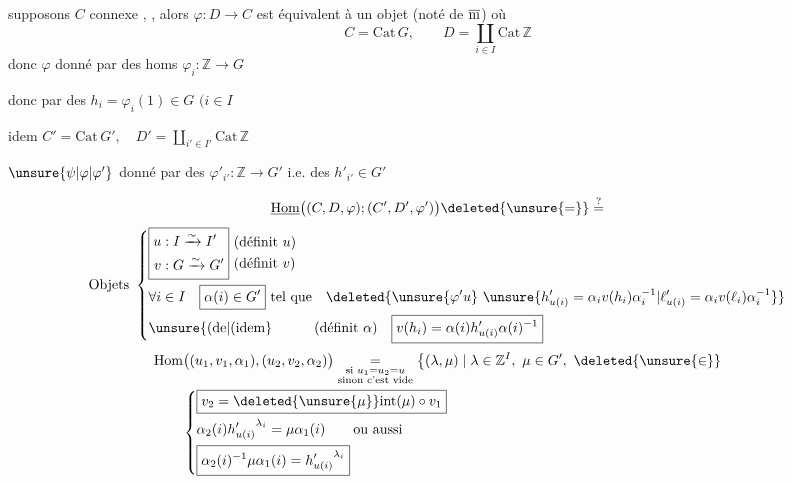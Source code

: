 supposons $C$ connexe , , alors $\varphi:D\to C$ est équivalent à un objet (noté de $\overline{\rm m}$) où
\[
 C=\mathrm{Cat}\,G,\qquad D=\coprod_{i\in I}\mathrm{Cat}\,\mathbb Z
\]
donc $\varphi$ donné par des homs $\varphi_i:\mathbb Z\to G$

donc par des $h_i=\varphi_i(1)\in G$ \qquad $(i\in I$

idem \qquad $C'=\mathrm{Cat}\,G',\quad D'=\coprod_{i'\in I'}\mathrm{Cat}\,\mathbb Z$

$\unsure{\psi|\varphi|\varphi'}$ donné par des $\varphi'_{i'}:\mathbb Z\to G'$ i.e. des $h'_{i'}\in G'$

\[
\underline{\mathrm{Hom}}\big((C,D,\varphi);(C',D',\varphi')\big)\deleted{\unsure{=}}\overset{?}{=}
\]
\[
\text{Objets}\ \left\{\begin{aligned}
&\boxed{\begin{aligned}u &:I\xrightarrow{\sim}I'\\v &:G\xrightarrow{\sim}G'\end{aligned}}\ 
  \begin{aligned}&\text{(définit $u$)}\\ &\text{(définit $v$)}\end{aligned}\\
&\forall i\in I \quad \boxed{\alpha(i)\in G'}\ \text{tel que}\quad
\deleted{\unsure{\varphi'u}\ \unsure{h'_{u(i)}=\alpha_i v(h_i)\alpha_i^{-1}|\ell'_{u(i)}=\alpha_i v(\ell_i)\alpha_i^{-1}}}\\
&\text{\unsure{(de|(idem}}\hspace{3em}\text{(définit $\alpha$)}\quad
\boxed{v(h_i)=\alpha(i)h'_{u(i)}\alpha(i)^{-1}}
\end{aligned}\right.
\]
\[
\begin{aligned}
&\mathrm{Hom}\big((u_1,v_1,\alpha_1),(u_2,v_2,\alpha_2)\big)
 \underset{\substack{\text{si }u_1=u_2=u\\\text{sinon c'est vide}}}{=}
 \big\{(\lambda,\mu)\mid\lambda\in\mathbb Z^I,\ \mu\in G',\ \deleted{\unsure{\in}}\\
&\qquad \left\{\begin{aligned}
&\boxed{v_2=\deleted{\unsure{\mu}}\mathrm{int}(\mu)\circ v_1}\\
&\alpha_2(i){h'_{u(i)}}^{\lambda_i}=\mu\alpha_1(i)\qquad \text{ou aussi}\\
&\boxed{\alpha_2(i)^{-1}\mu\alpha_1(i)={h'_{u(i)}}^{\lambda_i}}
\end{aligned}\right.
\end{aligned}
\]
